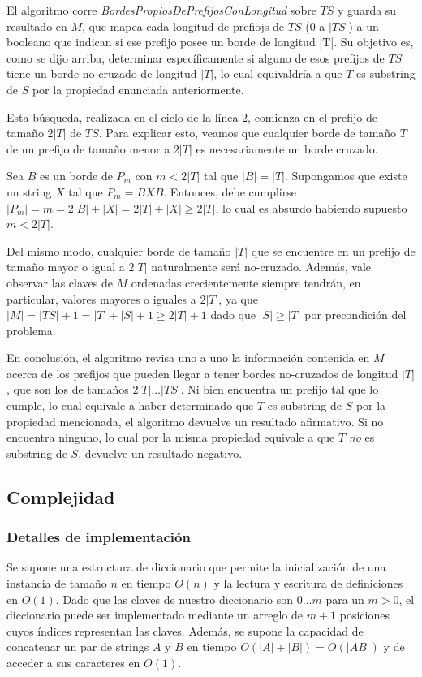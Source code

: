 \bigskip

El algoritmo corre \textit{BordesPropiosDePrefijosConLongitud} sobre $TS$ y guarda su resultado en $M$, que mapea cada longitud de prefiojs de $TS$ ($0$ a $|TS|$) a un booleano que indican si ese prefijo posee un borde de longitud |T|. Su objetivo es, como se dijo arriba, determinar específicamente si alguno de esos prefijos de $TS$ tiene un borde no-cruzado de longitud $|T|$, lo cual equivaldría a que $T$ es substring de $S$ por la propiedad enunciada anteriormente.

Esta búsqueda, realizada en el ciclo de la línea 2, comienza en el prefijo de tamaño $2|T|$ de $TS$. Para explicar esto, veamos que cualquier borde de tamaño $T$ de un prefijo de tamaño menor a $2|T|$ es necesariamente un borde cruzado.

Sea $B$ es un borde de $P_m$ con $m < 2|T|$ tal que $|B| = |T|$. Supongamos que existe un string $X$ tal que $P_m = BXB$. Entonces, debe cumplirse $|P_m| = m = 2|B|+|X| = 2|T| + |X| \geq 2|T|$, lo cual es absurdo habiendo supuesto $m < 2|T|$.

Del mismo modo, cualquier borde de tamaño $|T|$ que se encuentre en un prefijo de tamaño mayor o igual a $2|T|$ naturalmente será no-cruzado. Además, vale observar las claves de $M$ ordenadas crecientemente siempre tendrán, en particular, valores mayores o iguales a $2|T|$, ya que $|M| = |TS|+1 = |T|+|S|+1 \geq 2|T| + 1$ dado que $|S| \geq |T|$ por precondición del problema.

En conclusión, el algoritmo revisa uno a uno la información contenida en $M$ acerca de los prefijos que pueden llegar a tener bordes no-cruzados de longitud $|T|$, que son los de tamaños $2|T| \dots |TS|$. Ni bien encuentra un prefijo tal que lo cumple, lo cual equivale a haber determinado que $T$ es substring de $S$ por la propiedad mencionada, el algoritmo devuelve un resultado afirmativo. Si no encuentra ninguno, lo cual por la misma propiedad equivale a que $T$ \textit{no} es substring de $S$, devuelve un resultado negativo.
 
\subsection{Complejidad}

\subsubsection{Detalles de implementación}

Se supone una estructura de diccionario que permite la inicialización de una instancia de tamaño $n$ en tiempo $O(n)$ y la lectura y escritura de definiciones en $O(1)$. Dado que las claves de nuestro diccionario son $0 \dots m$ para un $m > 0$, el diccionario puede ser implementado mediante un arreglo de $m+1$ posiciones cuyos índices representan las claves. Además, se supone la capacidad de concatenar un par de strings $A$ y $B$ en tiempo $O(|A|+|B|) = O(|AB|)$ y de acceder a sus caracteres en $O(1)$.


